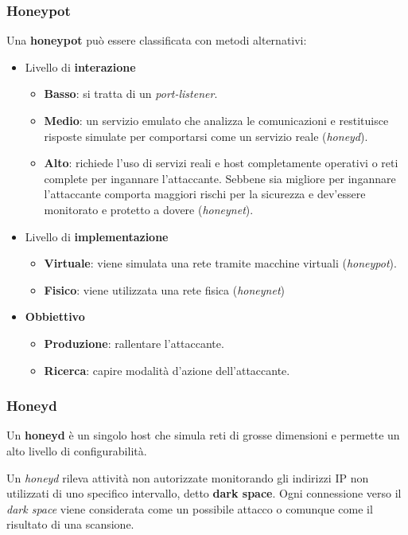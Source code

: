 \subsubsection{Honeypot}
Una \textbf{honeypot} può essere classificata con metodi alternativi:
\begin{itemize}
	\item Livello di \textbf{interazione}
	      \begin{itemize}
		      \item \textbf{Basso}: si tratta di un \emph{port-listener}.
		      \item \textbf{Medio}: un servizio emulato che analizza le comunicazioni e restituisce risposte simulate
		            per comportarsi come un servizio reale (\emph{honeyd}).
		      \item \textbf{Alto}: richiede l'uso di servizi reali e host completamente operativi o reti complete per
		            ingannare l'attaccante. Sebbene sia migliore per ingannare l'attaccante comporta maggiori rischi
		            per la sicurezza e dev'essere monitorato e protetto a dovere (\emph{honeynet}).
	      \end{itemize}
	\item Livello di \textbf{implementazione}
	      \begin{itemize}
		      \item \textbf{Virtuale}: viene simulata una rete tramite macchine virtuali (\emph{honeypot}).
		      \item \textbf{Fisico}: viene utilizzata una rete fisica (\emph{honeynet})
	      \end{itemize}
	\item \textbf{Obbiettivo}
	      \begin{itemize}
		      \item \textbf{Produzione}: rallentare l'attaccante.
		      \item \textbf{Ricerca}: capire modalità d'azione dell'attaccante.
	      \end{itemize}
\end{itemize}

\subsubsection{Honeyd}
Un \textbf{honeyd} è un singolo host che simula reti di grosse dimensioni e permette un alto livello di
configurabilità.

Un \emph{honeyd} rileva attività non autorizzate monitorando gli indirizzi IP non utilizzati di uno specifico
intervallo, detto \textbf{dark space}. Ogni connessione verso il \emph{dark space} viene considerata come un possibile
attacco o comunque come il risultato di una scansione.

